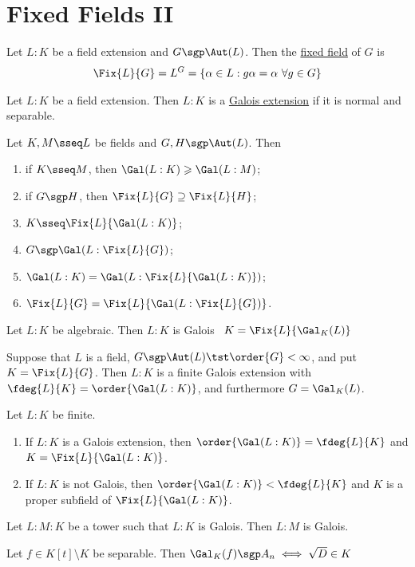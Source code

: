 \documentclass[a4paper]{article}
\begin{document}
\section{Fixed Fields II}
\begin{tdefinition}
  Let \( L:K \) be a field extension and \( G\sgp \Aut(L) \). Then the \ul{fixed field} of \( G \) is \begin{align*}
    \Fix{L}{G} = L^G = \{\alpha\in L : g\alpha= \alpha\ \forall g\in G\}
  \end{align*}
\end{tdefinition}

\begin{tdefinition}
  Let \( L:K \) be a field extension.
  Then \( L:K \) is a \ul{Galois extension} if it is normal and separable.
\end{tdefinition}

\begin{tlemma}
  Let \( K,M \sseq L \) be fields and \( G, H \sgp \Aut(L) \).
  Then \begin{enumerate}[label=\arabic*)]
    \item if \( K\sseq M \), then \( \Gal(L:K) \geqslant \Gal(L:M) \);
    \item if \( G\sgp H \), then \( \Fix{L}{G} \supseteq \Fix{L}{H} \);
    \item \( K\sseq \Fix{L}{\Gal(L:K)} \);
    \item \( G\sgp\Gal(L:\Fix{L}{G}) \);
    \item \( \Gal(L:K) = \Gal(L:\Fix{L}{\Gal(L:K)}) \);
    \item \( \Fix{L}{G} = \Fix{L}{\Gal(L:\Fix{L}{G})} \).
  \end{enumerate}
\end{tlemma}

\begin{ttheorem}
  Let \( L:K \) be algebraic.
  Then \( L:K \) is Galois \iff~\( K=\Fix{L}{\Gal_K(L)} \)
\end{ttheorem}

\begin{ttheorem}
  Suppose that \( L \) is a field, \( G\sgp \Aut(L) \tst \order{G}<\infty\), and put \( K=\Fix{L}{G} \).
  Then \( L:K \) is a finite Galois extension with \( \fdeg{L}{K}=\order{\Gal(L:K)} \), and furthermore \( G=\Gal_K(L) \).
\end{ttheorem}

\begin{ttheorem}
  Let \( L:K \) be finite.
  \begin{enumerate}
    \item If \( L:K \) is a Galois extension, then \( \order{\Gal(L:K)}=\fdeg{L}{K} \) and \( K=\Fix{L}{\Gal(L:K)} \).
    \item If \( L:K \) is not Galois, then \( \order{\Gal(L:K)}<\fdeg{L}{K} \) and \( K \) is a proper subfield of \( \Fix{L}{\Gal(L:K)} \).
  \end{enumerate}
\end{ttheorem}

\begin{tcorollary}
  Let \( L:M:K \) be a tower such that \( L:K \) is Galois.
  Then \( L:M \) is Galois.
\end{tcorollary}

\begin{tproposition}
  Let \( f \in K[t]\setminus K \) be separable.
  Then \( \Gal_K(f)\sgp A_n \iff \sqrt D\in K \)
\end{tproposition}
\end{document}
